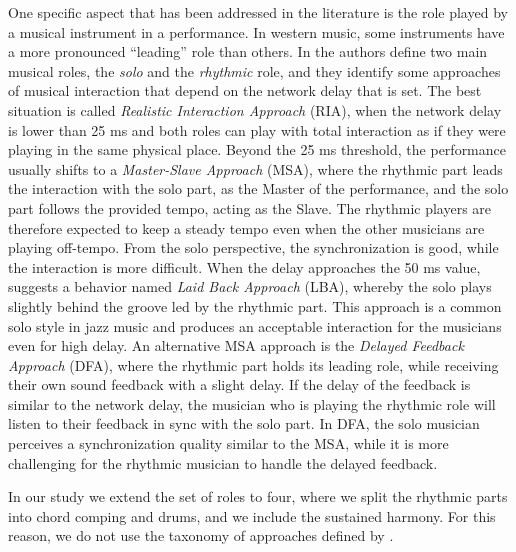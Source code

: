 One specific aspect that has been addressed in the literature is the role played by a musical instrument in a performance. In western music, some instruments have a more pronounced ``leading'' role than others. In \cite{Carot07networkmusic} the authors define two main musical roles, the \textit{solo} and the \textit{rhythmic} role, and they identify some approaches of musical interaction that depend on the network delay that is set. The best situation is called \textit{Realistic Interaction Approach} (RIA), when the network delay is lower than 25 ms and both roles can play with total interaction as if they were playing in the same physical place. Beyond the 25 ms threshold, the performance usually shifts to a \textit{Master-Slave Approach} (MSA), where the rhythmic part leads the interaction with the solo part, as the Master of the performance, and the solo part follows the provided tempo, acting as the Slave. The rhythmic players are therefore expected to keep a steady tempo even when the other musicians are playing off-tempo. From the solo perspective, the synchronization is good, while the interaction is more difficult. When the delay approaches the 50 ms value, \cite{Carot07networkmusic} suggests a behavior named \textit{Laid Back Approach} (LBA), whereby the solo plays slightly behind the groove led by the rhythmic part. This approach is a common solo style in jazz music and produces an acceptable interaction for the musicians even for high delay. An alternative MSA approach is the \textit{Delayed Feedback Approach} (DFA), where the rhythmic part holds its leading role, while receiving their own sound feedback with a slight delay. If the delay of the feedback is similar to the network delay, the musician who is playing the rhythmic role will listen to their feedback in sync with the solo part. In DFA, the solo musician perceives a synchronization quality similar to the MSA, while it is more challenging for the rhythmic musician to handle the delayed feedback. 

In our study we extend the set of roles to four, where we split the rhythmic parts into chord comping and drums, and we include the sustained harmony. For this reason, we do not use the taxonomy of approaches defined by \cite{Carot07networkmusic}.


